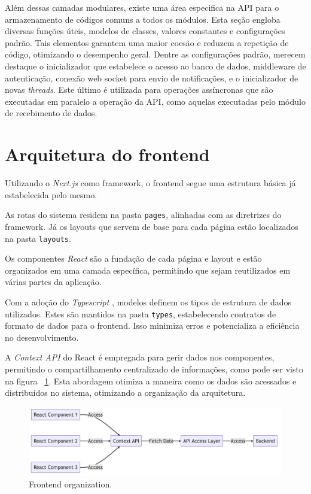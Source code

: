 Além dessas camadas modulares, existe uma área especifica na \gls{API} para o armazenamento de códigos comuns a todos os módulos. Esta seção engloba diversas funções úteis, modelos de classes, valores constantes e configurações padrão. Tais elementos garantem uma maior coesão e reduzem a repetição de código, otimizando o desempenho geral. Dentre as configurações padrão, merecem destaque o inicializador que estabelece o acesso ao banco de dados, middleware de autenticação, conexão web socket para envio de notificações, e o inicializador de novas \textit{threads}. Este último é utilizada para operações assíncronas que são executadas em paralelo a operação da \gls{API}, como aquelas executadas pelo módulo de recebimento de dados.

\section[Arquitetura do frontend]{Arquitetura do frontend}\label{sec:archFront}
Utilizando o \textit{Next.js} \cite{nextjsDocs} como framework, o frontend segue uma estrutura básica já estabelecida pelo mesmo.

As rotas do sistema residem na pasta \texttt{pages}, alinhadas com as diretrizes do framework. Já os layouts que servem de base para cada página estão localizados na pasta \texttt{layouts}.

Os componentes \textit{React} \cite{reactDocs} são a fundação de cada página e layout e estão organizados em uma camada específica, permitindo que sejam reutilizados em várias partes da aplicação.

Com a adoção do \textit{Typescript} \cite{typescriptLang}, modelos definem os tipos de estrutura de dados utilizados. Estes são mantidos na pasta \texttt{types}, estabelecendo contratos de formato de dados para o frontend. Isso minimiza erros e potencializa a eficiência no desenvolvimento.

A \textit{Context API} do React é empregada para gerir dados nos componentes, permitindo o compartilhamento centralizado de informações, como pode ser visto na figura ~\ref{fig:FrontendOrganization}. Esta abordagem otimiza a maneira como os dados são acessados e distribuídos no sistema, otimizando a organização da arquitetura.

\begin{figure}[htbp]
	\centering
	\includegraphics[width=\textwidth]{images/components_frontend.png}
	\caption{Frontend organization.}
	\label{fig:FrontendOrganization}
\end{figure}

